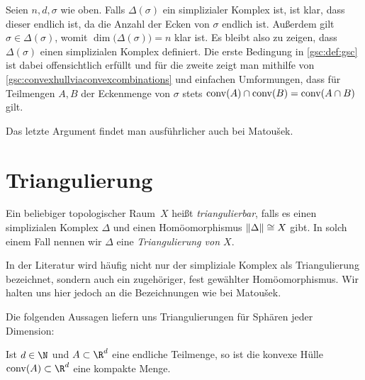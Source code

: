 \begin{proofsketch}
    Seien $n,d,\sigma$ wie oben. Falls $\Delta(\sigma)$ ein simplizialer Komplex
    ist, ist klar, dass dieser endlich ist, da die Anzahl der Ecken von $\sigma$
    endlich ist. Außerdem gilt $\sigma\in\Delta(\sigma)$, womit
    $\dim\bigl(\Delta(\sigma)\bigr) = n$ klar ist. Es bleibt also zu zeigen,
    dass $\Delta(\sigma)$ einen simplizialen Komplex definiert. Die erste
    Bedingung in \cref{gsc:def:gsc} ist dabei offensichtlich erfüllt und für die
    zweite zeigt man mithilfe von \cref{gsc:convexhullviaconvexcombinations} 
    und einfachen Umformungen, dass für Teilmengen $A,B$ der
    Eckenmenge von $\sigma$ stets $\operatorname{conv}(A)\cap\operatorname{conv}(B) = \operatorname{conv}(A\cap B)$ gilt.
    \\
\end{proofsketch}

Das letzte Argument findet man ausführlicher auch bei 
Matou\v sek\cite[Ch.\,1,.6]{bookc:matousek03}.


\section{Triangulierung}
\begin{thDef}
    Ein beliebiger topologischer Raum~$X$ heißt \emph{triangulierbar}, falls es
    einen simplizialen Komplex $\Delta$ und einen Homöomorphismus
    $\lVert\Delta\rVert \cong X$ gibt. In solch einem Fall nennen wir $\Delta$ eine
    \emph{Triangulierung von $X$}.
\end{thDef}

\Achtung
In der Literatur wird häufig nicht nur der simpliziale Komplex als
Triangulierung bezeichnet, sondern auch ein zugehöriger, fest gewählter
Homöomorphismus. Wir halten uns hier jedoch an die Bezeichnungen wie bei
Matou\v sek\cite{bookc:matousek03}.

\medskip
Die folgenden Aussagen liefern uns Triangulierungen für Sphären jeder
Dimension:

\begin{thLemma}
    \label{gsc:convexhullcompact}
    Ist $d\in\N$ und $A\subset\R^d$ eine endliche Teilmenge, so ist die konvexe
    Hülle $\conv(A)\subset\R^d$ eine kompakte Menge.
\end{thLemma}

